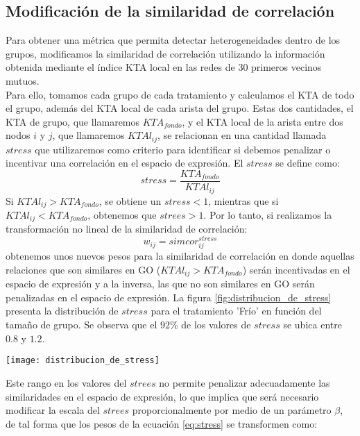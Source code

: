 \subsection{Modificación de la similaridad de correlación}
Para obtener una métrica que permita detectar heterogeneidades dentro de los grupos, modificamos la similaridad de correlación utilizando la información obtenida mediante el índice KTA local en las redes de 30 primeros vecinos mutuos.\\
Para ello, tomamos cada grupo de cada tratamiento y calculamos el KTA de todo el grupo, además del KTA local de cada arista del grupo. Estas dos cantidades, el KTA de grupo, que llamaremos $KTA_{fondo}$, y el KTA local de la arista entre dos nodos $i$ y $j$, que llamaremos $KTAl_{ij}$, se relacionan en una cantidad llamada $stress$ que utilizaremos como criterio para identificar si debemos penalizar o incentivar una correlación en el espacio de expresión. El $stress$ se define como:
\begin{equation}
	stress = \frac{KTA_{fondo}}{KTAl_{ij}}
\end{equation}
Si $KTAl_{ij} > KTA_{fondo}$, se obtiene un $stress < 1$, mientras que si $KTAl_{ij} < KTA_{fondo}$, obtenemos que $strees > 1$. Por lo tanto, si realizamos la transformación no lineal de la similaridad de correlación:
\begin{equation}
	w_{ij} = simcor_{ij}^{stress}
	\label{eq:stress}
\end{equation}
obtenemos unos nuevos pesos para la similaridad de correlación en donde aquellas relaciones que son similares en GO ($KTAl_{ij} > KTA_{fondo}$) serán incentivadas en el espacio de expresión y a la inversa, las que no son similares en GO serán penalizadas en el espacio de expresión. La figura \ref{fig:distribucion_de_stress} presenta la distribución de $stress$ para el tratamiento 'Frío' en función del tamaño de grupo. Se observa que el $92\%$ de los valores de $stress$ se ubica entre $0.8$ y $1.2$. 
\begin{center}
\texttt{[image: distribucion\_de\_stress]}
\label{fig:distribucion_de_stress}
\end{center}
Este rango en los valores del $strees$ no permite penalizar adecuadamente las similaridades en el espacio de expresión, lo que implica que será necesario modificar la escala del $strees$ proporcionalmente por medio de un parámetro $\beta$, de tal forma que los pesos de la ecuación \ref{eq:stress} se transformen como:

